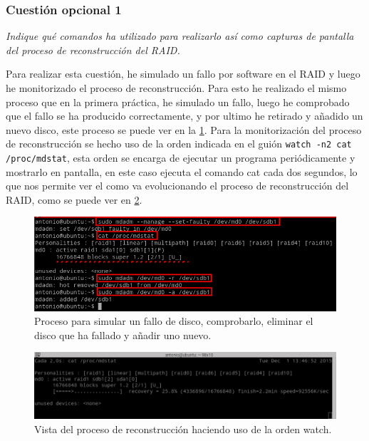 \subsubsection{Cuestión opcional 1}
\textit{Indique qué comandos ha utilizado para realizarlo así como capturas de pantalla del proceso de reconstrucción del RAID.}
\newline

Para realizar esta cuestión, he simulado un fallo por software en el RAID y luego he monitorizado el proceso de reconstrucción. Para esto he realizado el mismo proceso que en la primera práctica, he simulado un fallo, luego he comprobado que el fallo se ha producido correctamente, y por ultimo he retirado y añadido un nuevo disco, este proceso se puede ver en la \cref{fig18}\cite{fault}. Para la monitorización del proceso de reconstrucción se hecho uso de la orden indicada en el guión \texttt{watch -n2 cat /proc/mdstat}, esta orden se encarga de ejecutar un programa periódicamente y mostrarlo en pantalla\cite{watch}, en este caso ejecuta el comando cat cada dos segundos, lo que nos permite ver el como va evolucionando el proceso de reconstrucción del RAID, como se puede ver en \cref{fig19}.

\begin{figure}[H]
  \begin{center}
    \includegraphics[width=1\textwidth]{imagenes/mdadm}
    \caption{Proceso para simular un fallo de disco, comprobarlo, eliminar el disco que ha fallado y añadir uno nuevo.}
    \label{fig18}
  \end{center}
\end{figure}

\begin{figure}[H]
  \begin{center}
    \includegraphics[width=1\textwidth]{imagenes/watch}
    \caption{Vista del proceso de reconstrucción haciendo uso de la orden watch.}
    \label{fig19}
  \end{center}
\end{figure}

